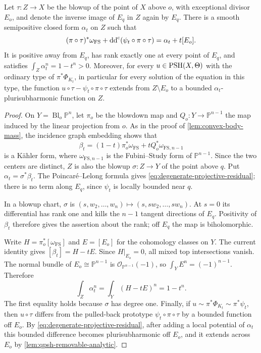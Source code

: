 \begin{proposition}\label{prop:degenerate-projective-residual}
Let $\tau\colon Z\to X$ be the blowup of the point of $X$ above $o$, with exceptional divisor $E_o$, and denote the inverse image of $E_q$ in $Z$ again by $E_q$. There is a smooth semipositive closed form $\alpha_t$ on $Z$ such that
\begin{equation}\label{eq:degenerate-projective-residual}
 (\pi\circ\tau)^*\omega_{\mathrm{FS}}
       +\mathrm{dd}^{\mathrm{c}}(\psi_t\circ\pi\circ\tau)=\alpha_t+t[E_o].
\end{equation}
It is positive away from $E_q$, has rank exactly one at every point of $E_q$, and satisfies $\int_Z\alpha_t^n=1-t^n>0$. Moreover, for every $u\in\mathrm{PSH}(X,\Theta)$ with the ordinary type of $\pi^*\Phi_{K_t}$, in particular for every solution of the equation in this type, the function $u\circ\tau-\psi_t\circ\pi\circ\tau$ extends from $Z\setminus E_o$ to a bounded $\alpha_t$-plurisubharmonic function on $Z$.
\end{proposition}
\begin{proof}
On $Y=\operatorname{Bl}_o\mathbb P^n$, let $\pi_o$ be the blowdown map and $Q_o\colon Y\to\mathbb P^{n-1}$ the map induced by the linear projection from $o$. As in the proof of \cref{lem:convex-body-mass}, the incidence graph embedding shows that
\[
 \beta_t=(1-t)\pi_o^*\omega_{\mathrm{FS}}
             +tQ_o^*\omega_{\mathrm{FS},n-1}
\]
is a K\"ahler form, where $\omega_{\mathrm{FS},n-1}$ is the Fubini--Study form of $\mathbb P^{n-1}$. Since the two centers are distinct, $Z$ is also the blowup $\sigma\colon Z\to Y$ of the point above $q$. Put $\alpha_t=\sigma^*\beta_t$. The Poincar\'e--Lelong formula gives \eqref{eq:degenerate-projective-residual}; there is no term along $E_q$, since $\psi_t$ is locally bounded near $q$.

In a blowup chart, $\sigma$ is $(s,w_2,\ldots,w_n)\mapsto(s,sw_2,\ldots,sw_n)$. At $s=0$ its differential has rank one and kills the $n-1$ tangent directions of $E_q$. Positivity of $\beta_t$ therefore gives the assertion about the rank; off $E_q$ the map is biholomorphic.

Write $H=\pi_o^*[\omega_{\mathrm{FS}}]$ and $E=[E_o]$ for the cohomology classes on $Y$. The current identity gives $[\beta_t]=H-tE$. Since $H|_{E_o}=0$, all mixed top intersections vanish. The normal bundle of $E_o\cong\mathbb P^{n-1}$ is $\mathcal O_{\mathbb P^{n-1}}(-1)$, so $\int_YE^n=(-1)^{n-1}$. Therefore
\[
 \int_Z\alpha_t^n=\int_Y(H-tE)^n=1-t^n.
\]
The first equality holds because $\sigma$ has degree one. Finally, if $u\sim\pi^*\Phi_{K_t}\sim\pi^*\psi_t$, then $u\circ\tau$ differs from the pulled-back prototype $\psi_t\circ\pi\circ\tau$ by a bounded function off $E_o$. By \eqref{eq:degenerate-projective-residual}, after adding a local potential of $\alpha_t$ this bounded difference becomes plurisubharmonic off $E_o$, and it extends across $E_o$ by \cref{lem:qpsh-removable-analytic}.
\end{proof}

